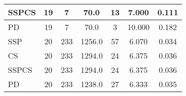 \documentclass{article}
\begin{document}
\begin{table}[H]
{\begin{tabular}{|l|c|c|c|c|c|c|}
SSPCS              & 19             & 7                 & 70.0                   & 13             & 7.000                     & 0.111                                   \\ \hline
PD                 & 19             & 7                 & 70.0                   & 3              & 10.000                    & 0.182                                   \\ \hline
SSP                & 20             & 233               & 1256.0                 & 57             & 6.070                     & 0.034                                   \\ \hline
CS                 & 20             & 233               & 1294.0                 & 24             & 6.375                     & 0.036                                   \\ \hline
SSPCS              & 20             & 233               & 1294.0                 & 24             & 6.375                     & 0.036                                   \\ \hline
PD                 & 20             & 233               & 1238.0                 & 27             & 6.333                     & 0.035                                   \\ \hline
\end{tabular}%
}
\label{tab:simulation2_set3_algorithm_metrics}
\end{table}

\begin{table}[H]
\centering
\caption{Simulation 2, Set 4: Graph Characteristics}
\label{tab:simulation2_set4_graph_characteristics}
\end{table}
\end{document}
